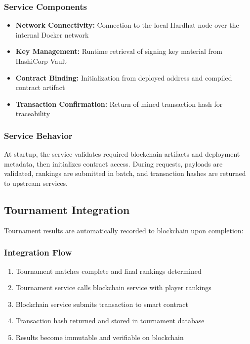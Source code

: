 \documentclass[11pt,a4paper]{report}
\begin{document}
\subsubsection{Service Components}
\begin{itemize}
  \item \textbf{Network Connectivity:} Connection to the local Hardhat node over the internal Docker network
  \item \textbf{Key Management:} Runtime retrieval of signing key material from HashiCorp Vault
  \item \textbf{Contract Binding:} Initialization from deployed address and compiled contract artifact
  \item \textbf{Transaction Confirmation:} Return of mined transaction hash for traceability
\end{itemize}

\subsubsection{Service Behavior}
At startup, the service validates required blockchain artifacts and deployment metadata, then initializes contract access. During requests, payloads are validated, rankings are submitted in batch, and transaction hashes are returned to upstream services.

\subsection{Tournament Integration}

Tournament results are automatically recorded to blockchain upon completion:

\subsubsection{Integration Flow}
\begin{enumerate}
  \item Tournament matches complete and final rankings determined
  \item Tournament service calls blockchain service with player rankings
  \item Blockchain service submits transaction to smart contract
  \item Transaction hash returned and stored in tournament database
  \item Results become immutable and verifiable on blockchain
\end{enumerate}
\end{document}
